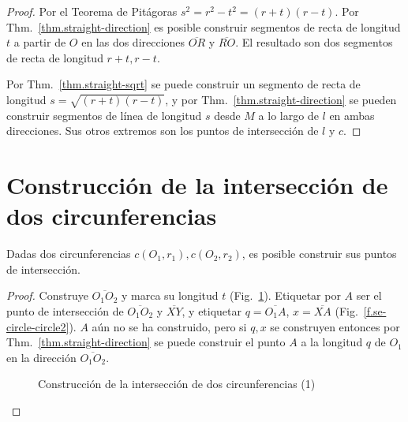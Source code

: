 {\begin{proof}
Por el Teorema de Pitágoras $s^2=r^2-t^2=(r+t)(r-t)$. Por Thm.~\ref{thm.straight-direction} es posible construir segmentos de recta de longitud $t$ a partir de $O$ en las dos direcciones $\overline{OR}$ y $\overline{RO}$. El resultado son dos segmentos de recta de longitud $r+t,r-t$.

Por Thm.~\ref{thm.straight-sqrt} se puede construir un segmento de recta de longitud $s=\sqrt{(r+t)(r-t)}$, y por Thm.~\ref{thm.straight-direction} se pueden construir segmentos de línea de longitud $s$ desde $M$ a lo largo de $l$ en ambas direcciones. Sus otros extremos son los puntos de intersección de $l$ y $c$.
\end{proof}

\section{Construcción de la intersección de dos circunferencias}\label{s.two-circles}

\begin{theorem}
Dadas dos circunferencias $c(O_1,r_1), c(O_2,r_2)$, es posible construir sus puntos de intersección.
\end{theorem}

\begin{proof}
Construye $\overline{O_1O_2}$ y marca su longitud $t$ (Fig.~\ref{f.se-circle-circle1}).
Etiquetar por $A$ ser el punto de intersección de $\overline{O_1O_2}$ y $\overline{XY}$, y etiquetar $q=\overline{O_1A}$, $x=\overline{XA}$ (Fig.~\ref{f.se-circle-circle2}). $A$ aún no se ha construido, pero si $q,x$ se construyen entonces por Thm.~\ref{thm.straight-direction} se puede construir el punto $A$ a la longitud $q$ de $O_1$ en la dirección $\overline{O_1O_2}$.

\begin{figure}[t]
\begin{center}
\end{center}
\caption{Construcción de la intersección de dos circunferencias (1)}\label{f.se-circle-circle1}
\end{figure}


\end{proof}}
